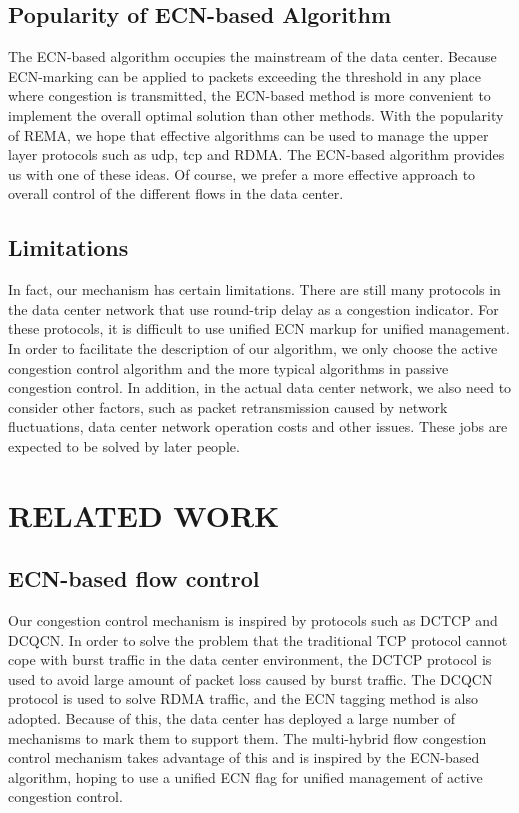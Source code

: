 \documentclass[conference]{IEEEtran}
\begin{document}
\subsection{Popularity of ECN-based Algorithm} The ECN-based algorithm occupies the mainstream of the data center. Because ECN-marking can be applied to packets exceeding the threshold in any place where congestion is transmitted, the ECN-based method is more convenient to implement the overall optimal solution than other methods. With the popularity of REMA, we hope that effective algorithms can be used to manage the upper layer protocols such as udp, tcp and RDMA. The ECN-based algorithm provides us with one of these ideas. Of course, we prefer a more effective approach to overall control of the different flows in the data center.
\subsection{Limitations}In fact, our mechanism has certain limitations. There are still many protocols in the data center network that use round-trip delay as a congestion indicator. For these protocols, it is difficult to use unified ECN markup for unified management. In order to facilitate the description of our algorithm, we only choose the active congestion control algorithm and the more typical algorithms in passive congestion control. In addition, in the actual data center network, we also need to consider other factors, such as packet retransmission caused by network fluctuations, data center network operation costs and other issues. These jobs are expected to be solved by later people.
\section{RELATED WORK}
\subsection{ECN-based flow control}Our congestion control mechanism is inspired by protocols such as DCTCP and DCQCN. In order to solve the problem that the traditional TCP protocol cannot cope with burst traffic in the data center environment, the DCTCP protocol is used to avoid large amount of packet loss caused by burst traffic. The DCQCN protocol is used to solve RDMA traffic, and the ECN tagging method is also adopted. Because of this, the data center has deployed a large number of mechanisms to mark them to support them. The multi-hybrid flow congestion control mechanism takes advantage of this and is inspired by the ECN-based algorithm, hoping to use a unified ECN flag for unified management of active congestion control.
\end{document}
